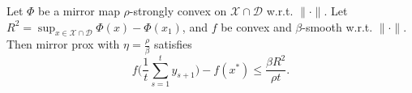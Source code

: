 %
%
%

\begin{theorem}
Let $\Phi$ be a mirror map $\rho$-strongly convex on $\mathcal{X} \cap \mathcal{D}$ w.r.t. $\|\cdot\|$. Let $R^2 = \sup_{x \in \mathcal{X} \cap \mathcal{D}} \Phi(x) - \Phi(x_1)$, and $f$ be convex and $\beta$-smooth w.r.t. $\|\cdot\|$. Then mirror prox with $\eta = \frac{\rho}{\beta}$ satisfies
$$f\bigg(\frac{1}{t} \sum_{s=1}^t y_{s+1} \bigg) - f(x^*) \leq \frac{\beta R^2}{\rho t} .$$
\end{theorem}

